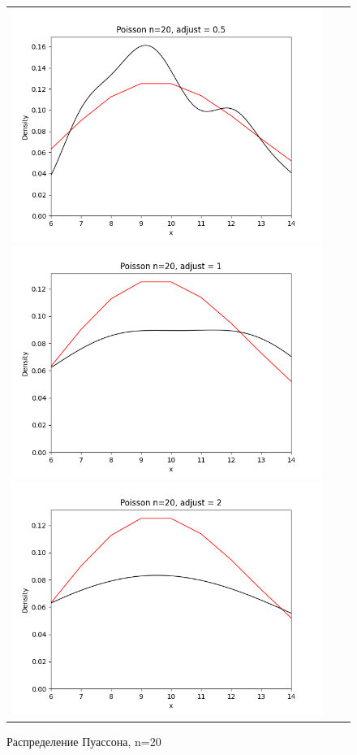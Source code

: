 \begin{figure}[H]
	\begin{tabular}{ccc}
		\includegraphics[scale=0.33]{poisson_n20_adjust0.5.png}
		\includegraphics[scale=0.33]{poisson_n20_adjust1.png}
		\includegraphics[scale=0.33]{poisson_n20_adjust2.png}
	\end{tabular}
	\caption{Распределение Пуассона, n=20}
\end{figure}

